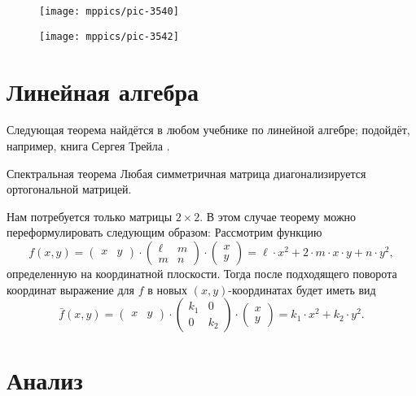 \begin{figure}[ht!]
\begin{minipage}{.48\textwidth}
\centering
\texttt{[image: mppics/pic-3540]}
\end{minipage}\hfill
\begin{minipage}{.48\textwidth}
\centering
\texttt{[image: mppics/pic-3542]}
\end{minipage}
\end{figure}

\section{Линейная алгебра}

Следующая теорема найдётся в любом учебнике по линейной алгебре;
подойдёт, например, книга Сергея Трейла \cite{treil}.

{\sloppy

\begin{thm}{Спектральная теорема}\label{thm:spectral}
Любая симметричная матрица диагонализируется ортогональной матрицей.
\end{thm}

}

Нам потребуется только матрицы $2{\times}2$.
В этом случае теорему можно переформулировать следующим образом:
Рассмотрим функцию
\[f(x,y)=
\begin{pmatrix}
x&y
\end{pmatrix}
\cdot
\begin{pmatrix}
\ell&m
\\
m&n
\end{pmatrix}
\cdot
\begin{pmatrix}
x\\y
\end{pmatrix}
=\ell\cdot x^2+2\cdot m\cdot x\cdot y+n\cdot y^2,\]
определенную на координатной плоскости.
Тогда после подходящего поворота координат
выражение для $f$ в новых $(x,y)$-координатах будет иметь вид
\[\bar f(x,y)=
\begin{pmatrix}
x&y
\end{pmatrix}
\cdot
\begin{pmatrix}
k_1&0
\\
0&k_2
\end{pmatrix}
\cdot
\begin{pmatrix}
x\\y
\end{pmatrix}
=k_1\cdot x^2+k_2\cdot y^2.\]

\section{Анализ}\label{sec:analysis}

